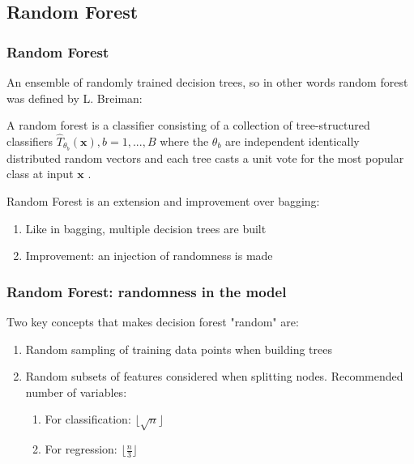\subsection{Random Forest}

\begin{frame}
\frametitle{Random Forest}

An ensemble of randomly trained decision trees, so in other words 
random forest was defined by L. Breiman:
\vspace{1ex}

\begin{theorem}
	A random forest is a classifier consisting of a collection of tree-structured classifiers ${\hat{T}_{\theta_{b}}(\textbf{x})}, b = 1,...,B$ where the $\theta_{b}$ are independent identically
	distributed random vectors and each tree casts a unit vote for the most popular class at input $\textbf{x}$ .
\end{theorem}
\vspace{4ex}

Random Forest is an extension and improvement over bagging:
\begin{enumerate}
\item Like in bagging, multiple decision trees are built
\item Improvement: an injection of randomness is made
\end{enumerate}

\end{frame}


\begin{frame}
\frametitle{Random Forest: randomness in the model}

Two key concepts that makes decision forest "random" are:
\begin{enumerate}
	\item Random sampling of training data points when building trees
	\item Random subsets of features considered when splitting nodes. Recommended number of variables:
	\begin{enumerate}[a]
	    \item For classification:  $\lfloor{\sqrt{n}} \rfloor$
	    \item For regression: $\lfloor \frac{n}{3} \rfloor$
	\end{enumerate}
\end{enumerate}


\end{frame}

